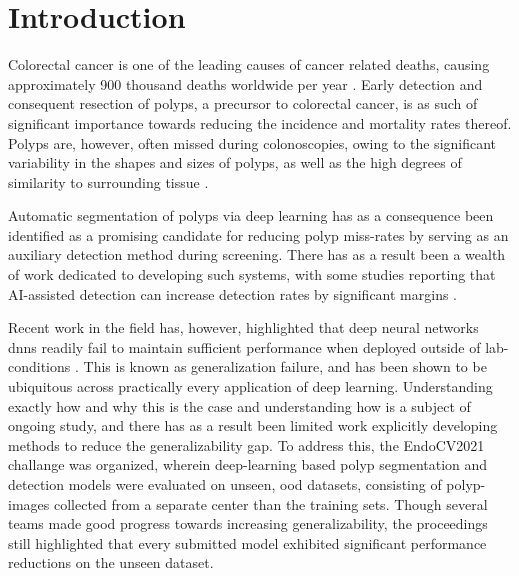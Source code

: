     \chapter{Introduction}
    Colorectal cancer is one of the leading causes of cancer related deaths, causing approximately 900 thousand deaths worldwide per year \cite{colorectal_cancer}. Early detection and consequent resection of polyps, a precursor to colorectal cancer, is as such of significant importance towards reducing the incidence and mortality rates thereof. Polyps are, however, often missed during colonoscopies, owing to the significant variability in the shapes and sizes of polyps, as well as the high degrees of similarity to surrounding tissue \cite{missrate1, missrate2}. 
    
    Automatic segmentation of polyps via deep learning has as a consequence been identified as a promising candidate for reducing polyp miss-rates by serving as an auxiliary detection method during screening. There has as a result been a wealth of work dedicated to developing such systems, with some studies reporting that AI-assisted detection can increase detection rates by significant margins \cite{polyp-success-story}.  
    
    Recent work in the field has, however, highlighted that deep neural networks \glspl{dnn} readily fail to maintain sufficient performance when deployed outside of lab-conditions \cite{damour2020underspecification, shortcut_learning, endocv2021}. This is known as generalization failure, and has been shown to be ubiquitous across practically every application of deep learning. Understanding exactly how and why this is the case and understanding how is a subject of ongoing study, and there has as a result been limited work explicitly developing methods to reduce the generalizability gap. To address this, the EndoCV2021 challange was organized, wherein deep-learning based polyp segmentation and detection models were evaluated on unseen, \gls{ood} datasets, consisting of polyp-images collected from a separate center than the training sets. Though several teams made good progress towards increasing generalizability, the proceedings still highlighted that every submitted model exhibited significant performance reductions on the unseen dataset.

